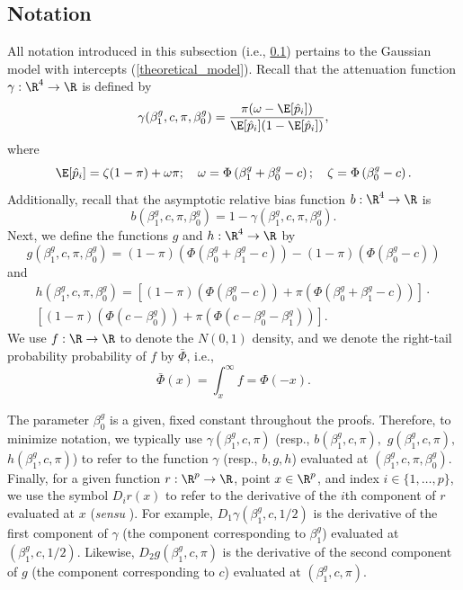 \documentclass[11pt]{article}
\begin{document}
\begin{appendices}
\begin{refsection}
\subsection{Notation}\label{sec:notation}
 All notation introduced in this subsection (i.e., \ref{sec:notation}) pertains to the Gaussian model with intercepts (\ref{theoretical_model}). Recall that the attenuation function $\gamma: \R^4 \to \R$ is defined by
$$ \gamma(\beta^g_1, c, \pi, \beta^g_0) = \frac{\pi(\omega - \E[\hat{p}_i])}{ \E[\hat{p}_i](1 -\E[\hat{p}_i])},$$ where $$\E[\hat{p}_i] = \zeta(1-\pi) + \omega\pi; \quad \omega = \Phi\left(\beta_1^g + \beta_0^g - c \right); \quad \zeta = \Phi\left( \beta^g_0 - c \right).$$ Additionally, recall that the asymptotic relative bias function $b: \R^4 \to \R$ is
$$ b(\beta^g_1, c, \pi, \beta^g_0) = 1 - \gamma(\beta^g_1, c, \pi, \beta^g_0).$$ Next, we define the functions $g$ and $h: \R^4 \to \R$ by
\begin{equation}\label{def_g}
g(\beta^g_1, c, \pi, \beta^g_0) = (1-\pi)\left( \Phi(\beta_0^g + \beta_1^g - c)\right) - (1-\pi)\left(\Phi(\beta_0^g - c)\right)\end{equation}
 and
\begin{multline}\label{def_h}
h(\beta^g_1, c, \pi, \beta^g_0) = \left[(1-\pi)\left( \Phi(\beta_0^g - c)\right) + \pi\left(\Phi(\beta^g_0 + \beta^g_1 - c) \right) \right] \cdot \\ \left[(1-\pi)\left( \Phi(c - \beta^g_0) \right) + \pi\left(\Phi(c - \beta_0^g - \beta_1^g) \right) \right].
\end{multline}
We use $f:\R \to \R$ to denote the $N(0,1)$ density, and we denote the right-tail probability probability of $f$ by $\bar{\Phi}$, i.e.,
$$\bar{\Phi}(x) = \int_{x}^{\infty} f = \Phi(-x).$$

The parameter $\beta^g_0$ is a given, fixed constant throughout the proofs. Therefore, to minimize notation, we typically use $\gamma(\beta^g_1, c, \pi)$ (resp., $b(\beta^g_1, c, \pi),$ $g(\beta^g_1, c, \pi),$ $h(\beta^g_1, c, \pi)$) to refer to the function $\gamma$ (resp., $b, g, h$) evaluated at $(\beta^g_1, c, \pi, \beta^g_0)$. Finally, for a given function $r: \R^{p} \to \R$, point $x \in \R^p$, and index $i \in \{1, \dots, p\}$, we use the symbol $D_i r(x)$ to refer to the derivative of the $i$th component of $r$ evaluated at $x$ (\textit{sensu} \cite{fitzpatrick2009}). For example, $D_1 \gamma(\beta^g_1, c, 1/2)$ is the derivative of the first component of $\gamma$ (the component corresponding to $\beta^g_1$) evaluated at $(\beta^g_1, c, 1/2)$. Likewise,  $D_2g(\beta^g_1, c, \pi)$ is the derivative of the second component of $g$ (the component corresponding to $c$) evaluated at $(\beta^g_1, c, \pi).$


\end{refsection}
\end{appendices}
\end{document}
